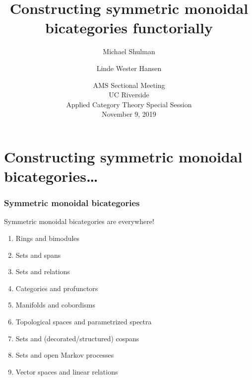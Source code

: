 \documentclass{beamer}
\title{Constructing symmetric monoidal bicategories functorially}
\author{Michael Shulman \and Linde Wester Hansen}
\date{AMS Sectional Meeting\\UC Riverside\\Applied Category Theory Special Session\\November 9, 2019}
\begin{document}
\begin{frame}
  \maketitle
\end{frame}

\section{Constructing symmetric monoidal bicategories\dots}

\begin{frame}
  \frametitle{Symmetric monoidal bicategories}
  Symmetric monoidal bicategories are everywhere!
  \begin{enumerate}
  \item Rings and bimodules
  \item Sets and spans
  \item Sets and relations
  \item Categories and profunctors
  \item Manifolds and cobordisms
  \item Topological spaces and parametrized spectra
  \item Sets and (decorated/structured) cospans
  \item Sets and open Markov processes
  \item Vector spaces and linear relations
  \end{enumerate}
\end{frame}
\end{document}
